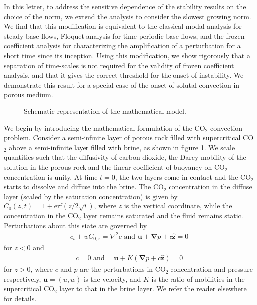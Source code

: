 \documentclass[letterpaper,10pt,prl,twocolumn,aps,reprint,superscriptaddress]{revtex4-1}
\newcommand{\cotwo}{CO$_2$ }
\newcommand{\erf}{\text{erf}}
\newcommand{\bu}{\boldsymbol{u}}
\newcommand{\bz}{\hat{\boldsymbol{z}}}
\newcommand{\grad}{\boldsymbol{\nabla}}
\begin{document}
In this letter, to address the sensitive dependence of the stability results on the choice of the norm, we extend the analysis to consider the slowest growing norm.
We find that this modification is equivalent to the classical modal analysis for steady base flows, Floquet analysis for time-periodic base flows, and the frozen coefficient analysis for characterizing the amplification of a perturbation for a short time since its inception. 
Using this modification, we show rigorously that a separation of time-scales is not required for the validity of frozen coefficient analysis, and that it gives the correct threshold for the onset of instability.
We demonstrate this result for a special case of the onset of solutal convection in porous medium.

\begin{figure}[b]
\vspace{5cm}
\caption{Schematic representation of the mathematical model.}
\label{fig:Schematic}
\end{figure}

We begin by introducing the mathematical formulation of the \cotwo convection problem.
Consider a semi-infinite layer of porous rock filled with supercritical \cotwo above a semi-infinite layer filled with brine, as shown in figure \ref{fig:Schematic}. 
We scale quantities such that the diffusivity of carbon dioxide, the Darcy mobility of the solution in the porous rock and the linear coefficient of buoyancy on \cotwo concentration is unity. 
At time $t=0$, the two layers come in contact and the \cotwo starts to dissolve and diffuse into the brine. 
The \cotwo concentration in the diffuse layer (scaled by the saturation concentration) is given by $C_0(z,t) = 1 + \erf( {z}/{2\sqrt{t}})$, where $z$ is the vertical coordinate, while the concentration in the \cotwo layer remains saturated and the fluid remains static. 
Perturbations about this state are governed by 
\begin{align}
 c_t + w C_{0,z} = \nabla^2 c \text{ and }
 \bu + \grad p + c\bz = 0
\end{align}
for $z<0$ and 
\begin{align}
 c = 0 \text{ and } \quad \bu + K (\grad p + c\bz) = 0
\end{align}
for $z>0$, where $c$ and $p$ are the perturbations in \cotwo concentration and pressure respectively, $\bu = (u,w)$ is the velocity, and $K$ is the ratio of mobilities in the supercritical \cotwo layer to that in the brine layer. 
We refer the reader elsewhere\cite{SlimRama10} for details. 
\end{document}
